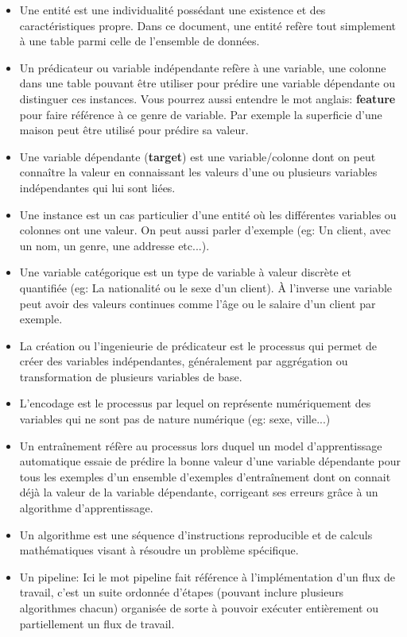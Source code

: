 \begin{itemize}
    \item Une entité est une individualité possédant une existence et des caractéristiques propre. Dans ce document, une entité refère tout simplement à une table parmi celle de l'ensemble de données.
    \item Un prédicateur ou variable indépendante refère à une variable, une colonne dans une table pouvant être utiliser pour prédire une variable dépendante ou distinguer ces instances. Vous pourrez aussi entendre le mot anglais: \textbf{feature} pour faire référence à ce genre de variable. Par exemple la superficie d'une maison peut être utilisé pour prédire sa valeur.
    \item Une variable dépendante (\textbf{target}) est une variable/colonne dont on peut connaître la valeur en connaissant les valeurs d'une ou plusieurs variables indépendantes qui lui sont liées.
    \item Une instance est un cas particulier d'une entité où les différentes variables ou colonnes ont une valeur. On peut aussi parler d'exemple (eg: Un client, avec un nom, un genre, une addresse etc...).
    \item Une variable catégorique est un type de variable à valeur discrète et quantifiée (eg: La nationalité ou le sexe d'un client). À l'inverse une variable peut avoir des valeurs continues comme l'âge ou le salaire d'un client par exemple.
    \item La création ou l'ingenieurie de prédicateur est le processus qui permet de créer des variables indépendantes, généralement par aggrégation ou transformation de plusieurs variables de base.
    \item L'encodage est le processus par lequel on représente numériquement des variables qui ne sont pas de nature numérique (eg: sexe, ville...)
    \item Un entraînement réfère au processus lors duquel un model d'apprentissage automatique essaie de prédire la bonne valeur d'une variable dépendante pour tous les exemples d'un ensemble d'exemples d'entraînement dont on connait déjà la valeur de la variable dépendante, corrigeant ses erreurs grâce à un algorithme d'apprentissage.
    \item Un algorithme est une séquence d'instructions reproducible et de calculs mathématiques visant à résoudre un problème spécifique.
    \item Un pipeline: Ici le mot pipeline fait référence à l'implémentation d'un flux de travail, c'est un suite ordonnée d'étapes (pouvant inclure plusieurs algorithmes chacun) organisée de sorte à pouvoir exécuter entièrement ou partiellement un flux de travail.
\end{itemize}

